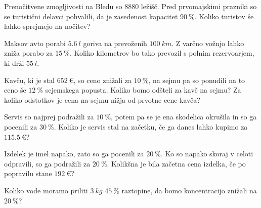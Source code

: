                 \begin{naloga}
                    Prenočitvene zmogljivosti na Bledu so $8880$ ležišč. Pred prvomajskimi prazniki so se turistični delavci pohvalili,
                    da je zasedenost kapacitet $90~\%$. Koliko turistov še lahko sprejmejo na nočitev? 
                \end{naloga}
    
                \begin{naloga}
                    Maksov avto porabi $5.6~l$ goriva na prevoženih $100~km$. 
                    Z varčno vožnjo lahko zniža porabo za $15~\%$.
                    Koliko kilometrov bo tako prevozil s polnim rezervoarjem, ki drži $55~l$. 
                \end{naloga}
            
    
    
            
                \begin{naloga}
                    Kavču, ki je stal $652~€$, so ceno znižali za $10~\%$, na sejmu pa so ponudili na to ceno še $12~\%$ sejemskega popusta.
                    Koliko bomo odšteli za kavč na sejmu? Za koliko odstotkov je cena na sejmu nižja od prvotne cene kavča? 
                \end{naloga}
    
                
                \begin{naloga}
                    Servis so najprej podražili za $10~\%$, potem pa se je ena skodelica okrušila in so ga pocenili za $30~\%$.
                    Koliko je servis stal na začetku, če ga danes lahko kupimo za $115.5~€$? 
                \end{naloga}
    
                \begin{naloga}
                    Izdelek je imel napako, zato so ga pocenili za $20~\%$. Ko so napako skoraj v celoti odpravili, so ga podražili za $20~\%$.
                    Kolikšna je bila začetna cena izdelka, če po popravilu stane $192~€$? 
                \end{naloga}
    
            
    
    
            
                \begin{naloga}
                    Koliko vode moramo priliti $3~kg$ $45~\%$ raztopine, da bomo koncentracijo znižali na $20~\%$? 
                \end{naloga}
    
